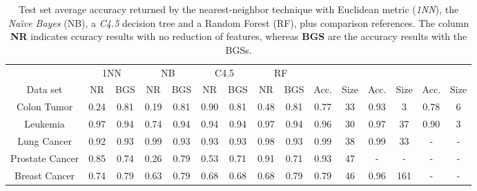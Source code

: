 \documentclass{article}
\begin{document}
\begin{table*}[!htb]
  \centering
  \begin{footnotesize}
  \begin{tabular}{|@{~}c@{~}|c@{~}c|c@{~}c|c@{~}c|c@{~}c|c@{~}c@{~}|c@{~}c@{~}|c@{~}c@{~}|}
  \hline
          & \multicolumn{ 2}{|c}{1NN} & \multicolumn{ 2}{|c}{NB} & \multicolumn{ 2}{|c}{C4.5} & \multicolumn{ 2}{|c}{RF} & \multicolumn{ 2}{|c}{\cite{Bu07}} & \multicolumn{ 2}{|c}{\cite{Bo05}} & \multicolumn{ 2}{|c|}{\cite{To04}} \\
  \cline{2-15}
  Data set &   NR &  BGS &   NR &  BGS &   NR &  BGS &   NR &  BGS &  Acc. &Size &  Acc. &Size &  Acc. &Size\\
  \hline
  Colon Tumor     & 0.24 & 0.81 & 0.19 & 0.81 & 0.90 & 0.81 & 0.48 & 0.81 &  0.77 &  33 &  0.93 &   3 &  0.78 &   6 \\
  Leukemia        & 0.97 & 0.94 & 0.74 & 0.94 & 0.94 & 0.94 & 0.97 & 0.94 &  0.96 &  30 &  0.97 &  37 &  0.90 &   3 \\
  Lung Cancer     & 0.92 & 0.93 & 0.99 & 0.93 & 0.93 & 0.93 & 0.98 & 0.93 &  0.99 &  38 &  0.99 &  33 &     - &   - \\
  Prostate Cancer & 0.85 & 0.74 & 0.26 & 0.79 & 0.53 & 0.71 & 0.91 & 0.71 &  0.93 &  47 &     - &   - &     - &   - \\
  Breast Cancer   & 0.74 & 0.79 & 0.63 & 0.79 & 0.68 & 0.68 & 0.68 & 0.79 &  0.79 &  46 &  0.96 & 161 &     - &   - \\
  \hline
\end{tabular}
  \end{footnotesize}
  \caption{Test set average accuracy returned by the nearest-neighbor
    technique with Euclidean metric (\emph{1NN}), the \emph{Na\"{\i}ve
      Bayes} (NB), a \emph{C4.5} decision tree and a Random Forest
    (RF), plus comparison references. The column \textbf{NR} indicates
    ccuracy results with no reduction of features, whereas
    \textbf{BGS} are the accuracy results with the BGSs.}
\label{Tab:Acc}
\end{table*}
\end{document}

